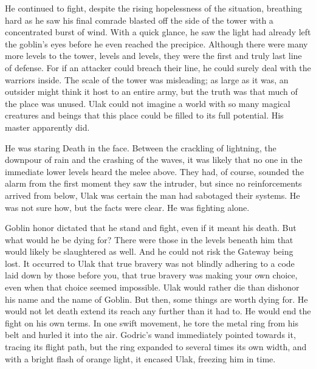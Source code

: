 He continued to fight, despite the rising hopelessness of the situation, breathing hard as he saw his final comrade blasted off the side of the tower with a concentrated burst of wind. With a quick glance, he saw the light had already left the goblin’s eyes before he even reached the precipice.
\SmallVSpace
Although there were many more levels to the tower, levels and levels, they were the first and truly last line of defense. For if an attacker could breach their line, he could surely deal with the warriors inside. The scale of the tower was misleading; as large as it was, an outsider might think it host to an entire army, but the truth was that much of the place was unused. Ulak could not imagine a world with so many magical creatures and beings that this place could be filled to its full potential. His master apparently did.

He was staring Death in the face. Between the crackling of lightning, the downpour of rain and the crashing of the waves, it was likely that no one in the immediate lower levels heard the melee above. They had, of course, sounded the alarm from the first moment they saw the intruder, but since no reinforcements arrived from below, Ulak was certain the man had sabotaged their systems. He was not sure how, but the facts were clear. He was fighting alone.

Goblin honor dictated that he stand and fight, even if it meant his death. But what would he be dying for? There were those in the levels beneath him that would likely be slaughtered as well. And he could not risk the Gateway being lost. It occurred to Ulak that true bravery was not blindly adhering to a code laid down by those before you, that true bravery was making your own choice, even when that choice seemed impossible. Ulak would rather die than dishonor his name and the name of Goblin.
\SmallVSpace
But then, some things are worth dying for.
\SmallVSpace
He would not let death extend its reach any further than it had to. He would end the fight on his own terms. In one swift movement, he tore the metal ring from his belt and hurled it into the air. Godric’s wand immediately pointed towards it, tracing its flight path, but the ring expanded to several times its own width, and with a bright flash of orange light, it encased Ulak, freezing him in time.

